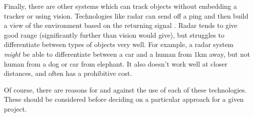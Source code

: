 Finally, there are other systems which can track objects without embedding a tracker or using vision. Technologies like radar can send off a ping and then build a view of the environment based on the returning signal \cite{sakpere2017state}. Radar tends to give good range (significantly further than vision would give), but struggles to differentiate between types of objects very well. For example, a radar system \emph{might} be able to differentiate between a car and a human from 1km away, but not human from a dog or car from elephant. It also doesn't work well at closer distances, and often has a prohibitive cost.

Of course, there are reasons for and against the use of each of these technologies. These should be considered before deciding on a particular approach for a given project.

